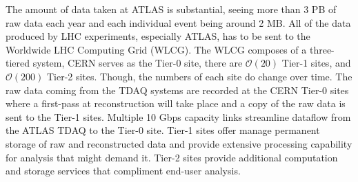 The amount of data taken at ATLAS is substantial, seeing more than 3 PB of raw data each year and each individual event being around 2 MB.\cite{ATLAS_Fact_Sheet} 
All of the data produced by LHC experiments, especially ATLAS, has to be sent to the Worldwide LHC Computing Grid (WLCG).\cite{WLCG_Tech_design_report}
The WLCG composes of a three-tiered system, CERN serves as the Tier-0 site, there are $\mathcal{O}(20)$ Tier-1 sites, and $\mathcal{O}(200)$ Tier-2 sites.\cite{Martelli_2015}
Though, the numbers of each site do change over time.
The raw data coming from the TDAQ systems are recorded at the CERN Tier-0 sites where a first-pass at reconstruction will take place and a copy of the raw data is sent to the Tier-1 sites.
Multiple 10 Gbps capacity links streamline dataflow from the ATLAS TDAQ to the Tier-0 site. 
Tier-1 sites offer manage permanent storage of raw and reconstructed data and provide extensive processing capability for analysis that might demand it.
Tier-2 sites provide additional computation and storage services that compliment end-user analysis.

